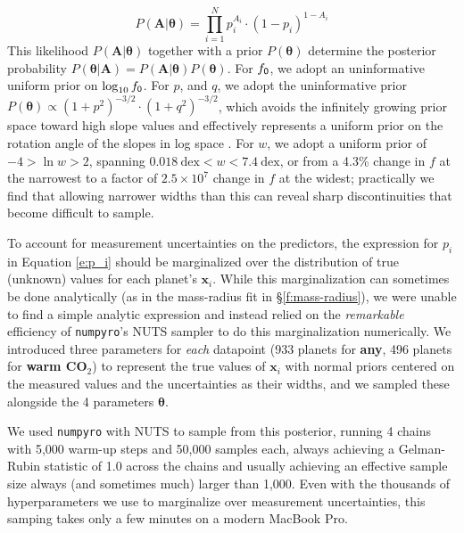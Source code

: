 \documentclass[modern,linenumbers,trackchanges]{aastex7}
\begin{document}
\begin{equation}
P(\mathbf{A} | \boldsymbol{\theta}) = \prod_{i=1}^{N} p_i^{A_i} \cdot (1-p_i)^{1-A_i}
\end{equation} 
This likelihood $P(\mathbf{A} | \boldsymbol{\theta})$
 together with a prior $P(\boldsymbol{\theta})$ determine the posterior probability $P(\boldsymbol{\theta} | \mathbf{A}) = P(\mathbf{A} | \boldsymbol{\theta}) P(\boldsymbol{\theta})$. For $f_{\sf 0}$, we adopt an uninformative uniform prior on $\log_{10} f_{\sf 0}$. For $p$, and $q$, we adopt the uninformative prior $P(\boldsymbol{\theta}) \propto (1+p^2)^{-3/2}\cdot (1+q^2)^{-3/2}$, which avoids the infinitely growing prior space toward high slope values and effectively represents a uniform prior on the rotation angle of the slopes in log space \citep[see][]{vanderplasFrequentismBayesianismPythondriven2014a}. For $w$, we adopt a uniform prior of $-4 > \ln w > 2$,  spanning $0.018~\mathrm{dex} < w < 7.4~\mathrm{dex}$, or from a 4.3\% change in $f$ at the narrowest to a factor of $2.5\times10^7$ change in $f$ at the widest; practically we find that allowing narrower widths than this can reveal sharp discontinuities that become difficult to sample. 

To account for measurement uncertainties on the predictors, the expression for $p_i$ in Equation \ref{e:p_i} should be marginalized over the distribution of true (unknown) values for each planet's $\mathbf{x}_i$. While this marginalization can sometimes be done analytically (as in the mass-radius fit in \S\ref{f:mass-radius}), we were unable to find a simple analytic expression and instead relied on the {\em remarkable} efficiency of \texttt{numpyro}'s NUTS sampler to do this marginalization numerically. We introduced three parameters for {\em each} datapoint (933 planets for {\bf any}, 496 planets for {\bf warm CO$_2$}) to represent the true values of $\mathbf{x}_i$ with normal priors centered on the measured values and the uncertainties as their widths, and we sampled these alongside the 4 parameters $\boldsymbol{\theta}$. 

We used \texttt{numpyro} with NUTS to sample from this posterior, running 4 chains with 5,000 warm-up steps and 50,000 samples each, always achieving a Gelman-Rubin statistic of 1.0 across the chains and usually achieving an effective sample size always (and sometimes much) larger than 1,000. Even with the thousands of hyperparameters we use to marginalize over measurement uncertainties, this samping takes only a few minutes on a modern MacBook Pro. 
\end{document}
